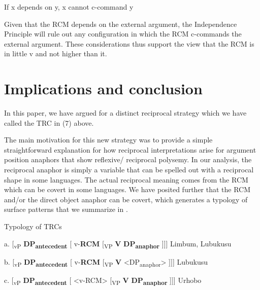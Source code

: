   If x depends on y, x cannot c-command y

Given that the RCM depends on the external argument, the Independence Principle will rule out any configuration in which the RCM c-commands the external argument. These considerations thus support the view that the RCM is in little v and not higher than it. 

\chapter{Implications and conclusion}

  In this paper, we have argued for a distinct reciprocal strategy which we have called the TRC in (7) above. 

The main motivation for this new strategy was to provide a simple straightforward explanation for how reciprocal interpretations arise for argument position anaphors that show reflexive/ reciprocal polysemy. In our analysis, the reciprocal anaphor is simply a variable that can be spelled out with a reciprocal shape in some languages. The actual reciprocal meaning comes from the RCM which can be covert in some languages. We have posited further that the RCM and/or the direct object anaphor can be covert, which generates a typology of surface patterns that we summarize in .

\begin{stylelsTableHeading}%
\begin{table}
\caption{Typology of TRCs}
\label{tab:1}
\end{table}\end{stylelsTableHeading}

\begin{stylelsTable}
  a.  [\textsubscript{vP }\textbf{DP}\textbf{\textsubscript{antecedent}} [ v-\textbf{RCM}   [\textsubscript{VP} \textbf{V}  \textbf{DP}\textbf{\textsubscript{anaphor}} ]]]     Limbum, Lubukusu
\end{stylelsTable}

\begin{stylelsTable}
  b.  [\textsubscript{vP }\textbf{DP}\textbf{\textsubscript{antecedent}} [ v-\textbf{RCM}   [\textsubscript{VP} \textbf{V}  {\textless}DP\textsubscript{anaphor}{\textgreater} ]]]    Lubukusu  
\end{stylelsTable}

\begin{stylelsTable}
  c.  [\textsubscript{vP }\textbf{DP}\textbf{\textsubscript{antecedent}} [ {\textless}v-RCM{\textgreater}   [\textsubscript{VP} \textbf{V}  \textbf{DP}\textbf{\textsubscript{anaphor}} ]]]    Urhobo
\end{stylelsTable}

